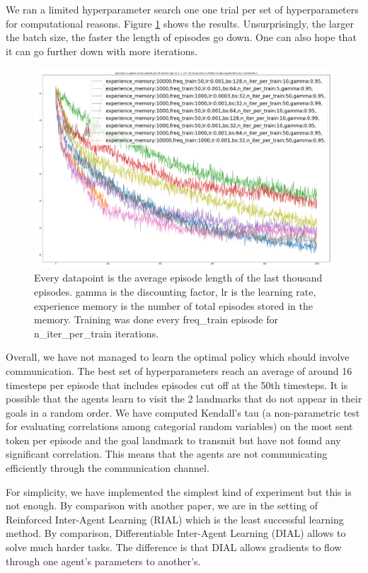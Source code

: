 \documentclass{article} %
\begin{document}
We ran a limited hyperparameter search one one trial per set of hyperparameters for computational reasons. Figure \ref{hyper_rpg} shows the results. Unsurprisingly, the larger the batch size, the faster the length of episodes go down. One can also hope that it can go further down with more iterations.

\begin{figure}[h]
\label{hyper_rpg}
\centering
\includegraphics[width=\textwidth]{hyperparams_rpg.png}
\caption{Every datapoint is the average episode length of the last thousand episodes. gamma is the discounting factor, lr is the learning rate, experience memory is the number of total episodes stored in the memory. Training was done every freq\_train episode for n\_iter\_per\_train iterations.}
\end{figure}

Overall, we have not managed to learn the optimal policy which should involve communication. The best set of hyperparameters reach an average of around 16 timesteps per episode that includes episodes cut off at the 50th timesteps. It is possible that the agents learn to visit the 2 landmarks that do not appear in their goals in a random order. We have computed Kendall's tau (a non-parametric test for evaluating correlations among categorial random variables) on the most sent token per episode and the goal landmark to transmit but have not found any significant correlation. This means that the agents are not communicating efficiently through the communication channel.

For simplicity, we have implemented the simplest kind of experiment but this is not enough. By comparison with another paper\cite{foerster2016learning}, we are in the setting of Reinforced Inter-Agent Learning (RIAL) which is the least successful learning method. By comparison, Differentiable Inter-Agent Learning (DIAL) allows to solve much harder tasks. The difference is that DIAL allows gradients to flow through one agent's parameters to another's.
\end{document}
